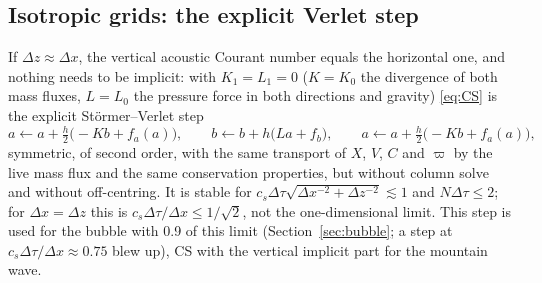 \documentclass[11pt,a4paper]{article}
\newcommand{\dtau}{\Delta\tau}
\newcommand{\pv}{\varpi}      %
\begin{document}
\subsection{Isotropic grids: the explicit Verlet step}\label{sec:verletexpl}
If $\Delta z\approx\Delta x$, the vertical acoustic Courant number equals the horizontal one, and nothing needs to
be implicit: with $K_1=L_1=0$ ($K=K_0$ the divergence of both mass fluxes, $L=L_0$ the pressure force in
both directions and gravity) \eqref{eq:CS} is the explicit Störmer--Verlet step
\[
a\leftarrow a+\tfrac h2\big(-Kb+f_a(a)\big),\qquad b\leftarrow b+h\big(La+f_b\big),\qquad a\leftarrow a+\tfrac h2\big(-Kb+f_a(a)\big),
\]
symmetric, of second order, with the same transport of $X$, $V$, $C$ and $\pv$ by the live mass flux and the
same conservation properties, but without column solve and without off-centring. It is stable for
$c_s\dtau\sqrt{\Delta x^{-2}+\Delta z^{-2}}\lesssim1$ and $N\dtau\le2$; for $\Delta x=\Delta z$ this is $c_s\dtau/\Delta x\le1/\sqrt2$, not the
one-dimensional limit. This step is used for the bubble with 0.9 of this limit (Section~\ref{sec:bubble}; a step at
$c_s\dtau/\Delta x\approx0.75$ blew up), CS with the vertical implicit part for the mountain wave.
\end{document}
